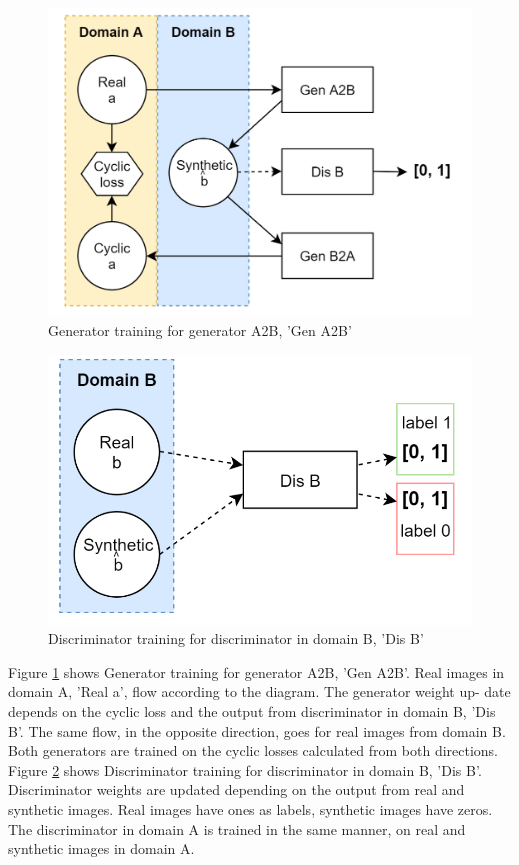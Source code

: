 \documentclass[UKenglish,12pt]{master-style}
\begin{document}
\begin{figure}[htbp]
    \centering
    \includegraphics[width=1\textwidth]{Images/Gen_Training.png}
    \caption{Generator training for generator A2B, ’Gen A2B’}
    \label{fig:Gen_Training}
\end{figure}

\begin{figure}[htbp]
    \centering
    \includegraphics[width=1\textwidth]{Images/Disc_Training.png}
    \caption{Discriminator training for discriminator in domain B, ’Dis B’}
    \label{fig:Disc_Training}
\end{figure}

Figure \ref{fig:Gen_Training} shows Generator training for generator A2B, ’Gen A2B’. Real images in domain A, ’Real a’, flow according to the diagram. The generator weight up- date depends on the cyclic loss and the output from discriminator in domain B, ’Dis B’. The same flow, in the opposite direction, goes for real images from domain B. Both generators are trained on the cyclic losses calculated from both directions. Figure \ref{fig:Disc_Training} shows Discriminator training for discriminator in domain B, ’Dis B’. Discriminator weights are updated depending on the output from real and synthetic images. Real images have ones as labels, synthetic images have zeros. The discriminator in domain A is trained in the same manner, on real and synthetic images in domain A.
\end{document}
